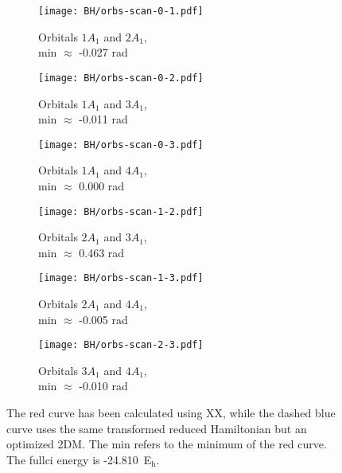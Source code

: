\begin{figure}
    \captionsetup{justification=centering}
    \begin{subfigure}[b]{0.5\textwidth}
        \texttt{[image: BH/orbs-scan-0-1.pdf]}
        \caption{Orbitals $1A_1$ and $2A_1$,\\ min $\approx$ -0.027 rad}
        \label{5-fig3-01}
    \end{subfigure}
    \quad
    \begin{subfigure}[b]{0.5\textwidth}
        \texttt{[image: BH/orbs-scan-0-2.pdf]}
        \caption{Orbitals $1A_1$ and $3A_1$,\\ min $\approx$ -0.011 rad}
        \label{5-fig3-02}
    \end{subfigure}
    \begin{subfigure}[b]{0.5\textwidth}
        \texttt{[image: BH/orbs-scan-0-3.pdf]}
        \caption{Orbitals $1A_1$ and $4A_1$,\\ min $\approx$ 0.000 rad}
        \label{5-fig3-03}
    \end{subfigure}
    \quad
    \begin{subfigure}[b]{0.5\textwidth}
        \texttt{[image: BH/orbs-scan-1-2.pdf]}
        \caption{Orbitals $2A_1$ and $3A_1$,\\ min $\approx$ 0.463 rad}
        \label{5-fig3-12}
    \end{subfigure}
    \begin{subfigure}[b]{0.5\textwidth}
        \texttt{[image: BH/orbs-scan-1-3.pdf]}
        \caption{Orbitals $2A_1$ and $4A_1$,\\ min $\approx$ -0.005 rad}
        \label{5-fig3-13}
    \end{subfigure}
    \quad
    \begin{subfigure}[b]{0.5\textwidth}
        \texttt{[image: BH/orbs-scan-2-3.pdf]}
        \caption{Orbitals $3A_1$ and $4A_1$,\\ min $\approx$ -0.010 rad}
        \label{5-fig3-23}
    \end{subfigure}
    \captionsetup{justification=raggedright}
    \caption{The red curve has been calculated using XX, while the dashed blue curve uses the same transformed reduced Hamiltonian but an optimized 2DM. The min refers to the minimum of the red curve. The \gls{fullci} energy is \mbox{-24.810 E$_\text{h}$}.}
    \label{5-fig3}
\end{figure}


